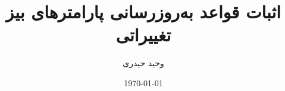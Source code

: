 ﻿\documentclass[12pt, onecolumn, a4paper]{article}
\begin{document}
\title{اثبات‌ قواعد به‌روزرسانی پارامترهای بیز تغییراتی}
\author{وحید حیدری}
\date{\today}
\maketitle





\clearpage

\\ \\ \\




\pagestyle{empty}
{
\small
\onehalfspacing


}
\end{document}
